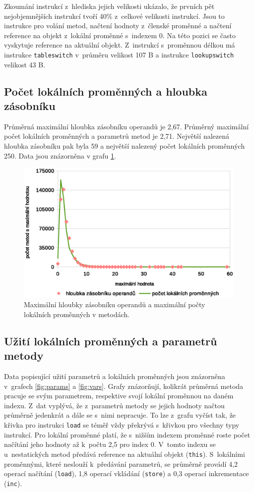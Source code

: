 Zkoumání instrukcí z~hlediska jejich velikosti ukázalo, že prvních pět nejobjemnějších instrukcí tvoří 40\% z~celkové velikosti instrukcí. Jsou to instrukce pro volání metod, načtení hodnoty z~členské proměnné a načtení reference na objekt z~lokální proměnné s~indexem 0. Na této pozici se často vyskytuje reference na aktuální objekt. Z~instrukcí s~proměnnou délkou má instrukce \texttt{tableswitch} v~průměru velikost 107 B a instrukce \texttt{lookupswitch} velikost 43 B.

\subsection{Počet lokálních proměnných a hloubka zásobníku}

Průměrná maximální hloubka zásobníku operandů je 2,67. Průměrný maximální počet lokálních proměnných a parametrů metod je 2,71. Největší nalezená hloubka zásobníku pak byla 59 a největší nalezený počet lokálních proměnných 250. Data jsou znázorněna v grafu \ref{fig:maxs}.

\begin{figure}[h!]
\centering
\includegraphics[scale=0.9]{fig/maxs}
\caption{Maximální hloubky zásobníku operandů a maximální počty lokálních proměnných v metodách.}\label{fig:maxs}
\end{figure}

\subsection{Užití lokálních proměnných a parametrů metody}

Data popisující užití parametrů a lokálních proměnných jsou znázorněna v~grafech \ref{fig:params} a \ref{fig:vars}. Grafy znázorňují, kolikrát průměrná metoda pracuje se svým parametrem, respektive svojí lokální proměnnou na daném indexu. 
Z~dat vyplývá, že z~parametrů metody se jejich hodnoty načtou průměrně jedenkrát a dále se s~nimi nepracuje. To lze z~grafu vyčíst tak, že křivka pro instrukci \texttt{load} se téměř vždy překrývá s~křivkou pro všechny typy instrukcí. Pro lokální proměnné platí, že s~nižším indexem proměnné roste počet načítání jeho hodnoty až k~počtu 2,5 pro index 0. V~tomto indexu se u~nestatických metod předává reference na aktuální objekt (\texttt{this}). S~lokálními proměnnými, které neslouží k~předávání parametrů, se průměrně provádí 4,2 operací načítání (\texttt{load}), 1,8 operací vkládání (\texttt{store}) a 0,3 operací inkrementace (\texttt{inc}).

